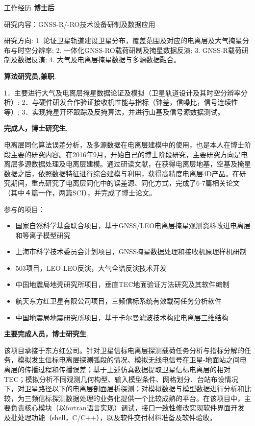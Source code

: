 \begin{rubric}{工作经历}
\entry*[2021-2 至今]\textbf{博士后}.

研究内容：GNSS-R/-RO技术设备研制及数据应用

研究方向: 1. 论证卫星轨道建设卫星分布，覆盖范围及对应的电离层及大气掩星分布与时空分辨率; 2. 一体化GNSS-RO载荷研制及掩星数据反演; 3. GNSS-R载荷研制及数据反演; 4. 大气及电离层掩星数据与多源数据融合。

\entry*[2020 至今]\textbf{算法研究员,兼职}.

1．主要进行大气及电离层掩星数据论证及模拟（卫星轨道设计及其时空分辨率分析）; 2．与硬件研发合作验证接收机性能与指标（钟差，信噪比，信号连续性等）; 3．实现掩星开环跟踪及反掩算法，并进行山基及信号源数据测试。

\entry*[2016-09 至 2020年7月]\space\textbf{完成人，博士研究生}.

电离层同化算法误差分析，及多源数据在电离层建模中的使用，也是本人在博士阶段主要的研究内容。在2016年9月，开始自己的博士阶段研究，主要研究方向是电离层多源数据处理及电离层建模。通过研读文献，在获得电离层地基，空基及掩星数据之后，依照数据特征进行综合建模与利用，获得高精度电离层4D产品。在研究期间，重点研究了电离层同化中的误差源、同化方式，完成了6-7篇相关论文（其中４篇一作，两篇SCI），并完成了博士论文。

参与的项目：
\begin{itemize}
      \item 国家自然科学基金联合项目，基于GNSS/LEO电离层掩星观测资料改进电离层和等离子模型研究
      \item 上海市科学技术委员会计划项目，GNSS掩星数据处理和接收机原理样机研制
      \item 503项目，LEO-LEO反演，大气全谱反演技术开发
      \item 中国地震局地壳研究所项目，垂直TEC地面验证方法研究及其软件编制
      \item 航天东方红卫星有限公司项目，三频信标系统有效载荷任务分析软件
      \item 中国地震局地震研究所项目，基于卡尔曼滤波技术构建电离层三维结构
\end{itemize}

\entry*[2015-06 至 2016-09]\space\textbf{主要完成人员，博士研究生}.

该项目承接于东方红公司。针对卫星信标电离层探测载荷任务分析与指标分解的任务，模拟发生信标电离层探测弧段的情况、模拟无线电信号在卫星-地面站之间电离层的传播过程和传播误差；基于上述仿真数据提取卫星信标电离层的相对TEC；模拟分析不同观测几何构型、输入模型条件、网格划分、台站布设情况下，对卫星路径以下的电离层剖面层析探测；对模拟数据与模型数据进行分析和比较，为三频信标探测数据处理的业务化提供一个比较成熟的平台。在该项目中，主要负责核心模块（以fortran语言实现）调试，接口一致性修改实现软件界面开发及批处理功能（shell，C/C++），以及软件交付材料准备及软件验收。


\end{rubric}
